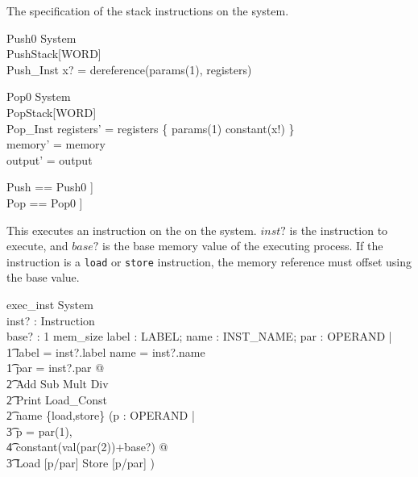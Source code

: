 \documentclass{article}
\begin{document}
The specification of the stack instructions on the system.

\begin{schema}{Push0}
  \Xi System\\
  PushStack[WORD]\\
  Push\_Inst
\where
  x? = dereference(params(1), registers)
\end{schema}

\begin{schema}{Pop0}
  \Delta System\\
  PopStack[WORD]\\
  Pop\_Inst
\where
  registers' = registers \oplus \{ params(1) \mapsto constant(x!) \}\\
  memory' = memory\\
  output' = output
\end{schema}

\begin{zed}
  Push == Push0 \project [ System ; Stack [WORD] ]\\
  Pop == Pop0 \project [System ; Stack [WORD] ]
\end{zed}

This executes an instruction on the on the system. $inst?$ is the
instruction to execute, and $base?$ is the base memory value of the
executing process. If the instruction is a {\tt load} or {\tt store}
instruction, the memory reference must offset using the base value.

\begin{schema}{exec\_inst}
  \Delta System\\
  inst? : Instruction\\
  base? : 1 \upto mem\_size
\where
  \exists label : \power LABEL; name : INST\_NAME; par : \seq OPERAND |\\
    \t1 label = inst?.label \land name = inst?.name \land \\
    \t1 par = inst?.par @\\
      \t2 Add \lor Sub \lor Mult \lor Div \lor\\
      \t2 Print \lor Load\_Const \lor\\
      \t2 name \in \{load,store\} \implies (\exists p : \seq OPERAND |\\
        \t3 p = \langle par(1), \\
          \t4 constant(val(par(2))+base?) \rangle @\\
        \t3 Load [p/par] \lor Store [p/par] )
\end{schema}
\end{document}
